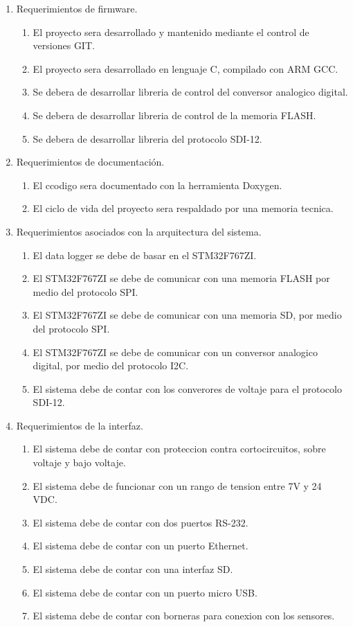 \documentclass[
11pt, %
codirector, %
]{charter}
\begin{document}
\begin{enumerate}
	\item Requerimientos de firmware.
		\begin{enumerate}
			\item El proyecto sera desarrollado y mantenido mediante el control de versiones GIT. 
			\item El proyecto sera desarrollado en lenguaje C, compilado con ARM GCC.
			\item Se debera de desarrollar libreria de control del conversor analogico digital.
			\item Se debera de desarrollar libreria de control de la memoria FLASH. 
			\item Se debera de desarrollar libreria del protocolo SDI-12.
		\end{enumerate}
	\item Requerimientos de documentación.
		\begin{enumerate}
			\item El ccodigo sera documentado con la herramienta Doxygen.
			\item El ciclo de vida del proyecto sera respaldado por una memoria tecnica.
		\end{enumerate}
	\item Requerimientos asociados con la arquitectura del sistema.
		\begin{enumerate}
		\item El data logger se debe de basar en el STM32F767ZI.
		\item El STM32F767ZI se debe de comunicar con una memoria FLASH por medio del protocolo SPI.
		\item El STM32F767ZI se debe de comunicar con una memoria SD, por medio del protocolo SPI.
		\item El STM32F767ZI se debe de comunicar con un conversor analogico digital, por medio del protocolo I2C.
		\item El sistema debe de contar con los converores de voltaje para el protocolo SDI-12.
		\end{enumerate}
	\item Requerimientos de la interfaz.
		\begin{enumerate}
		\item El sistema debe de contar con proteccion contra cortocircuitos, sobre voltaje y bajo voltaje. 
		\item El sistema debe de funcionar con un rango de tension entre 7V y 24 VDC.
		\item El sistema debe de contar con dos puertos RS-232.
		\item El sistema debe de contar con un puerto Ethernet.
		\item El sistema debe de contar con una interfaz SD.
		\item El sistema debe de contar con un puerto micro USB.
		\item El sistema debe de contar con borneras para conexion con los sensores.
		\end{enumerate}
\end{enumerate}
\end{document}
